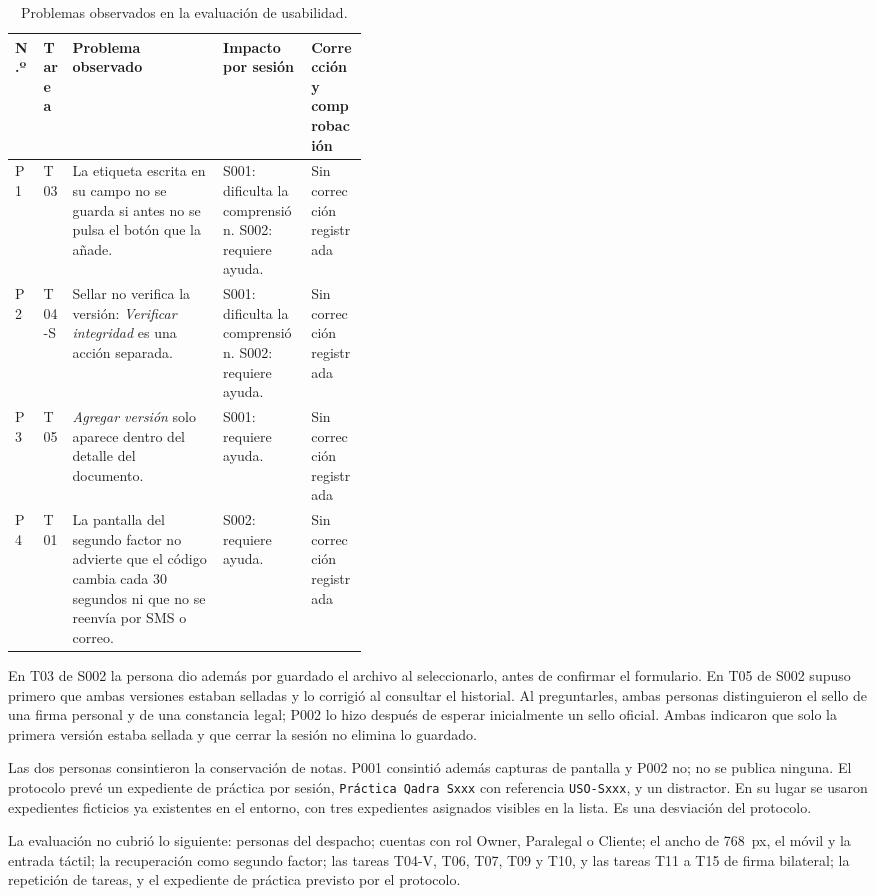 \begin{table}[H]
  \centering
  \caption{Problemas observados en la evaluación de usabilidad.}
  \label{tab:pruebas-usabilidad-problemas}
  
  \begin{tabularx}{\linewidth}{@{}l l X L{0.25\linewidth} L{0.16\linewidth}@{}}
    \toprule
    \textbf{N.º} & \textbf{Tarea} & \textbf{Problema observado} & \textbf{Impacto por sesión} & \textbf{Corrección y comprobación} \\
    \midrule
    P1 & T03 & La etiqueta escrita en su campo no se guarda si antes no se pulsa el botón que la añade. & S001: dificulta la comprensión. S002: requiere ayuda. & Sin corrección registrada \\
    \addlinespace
    P2 & T04-S & Sellar no verifica la versión: \emph{Verificar integridad} es una acción separada. & S001: dificulta la comprensión. S002: requiere ayuda. & Sin corrección registrada \\
    \addlinespace
    P3 & T05 & \emph{Agregar versión} solo aparece dentro del detalle del documento. & S001: requiere ayuda. & Sin corrección registrada \\
    \addlinespace
    P4 & T01 & La pantalla del segundo factor no advierte que el código cambia cada 30 segundos ni que no se reenvía por SMS o correo. & S002: requiere ayuda. & Sin corrección registrada \\
    \bottomrule
  \end{tabularx}
\end{table}

En T03 de S002 la persona dio además por guardado el archivo al seleccionarlo,
antes de confirmar el formulario. En T05 de S002 supuso primero que ambas
versiones estaban selladas y lo corrigió al consultar el historial. Al
preguntarles, ambas personas distinguieron el sello de una firma personal y de
una constancia legal; P002 lo hizo después de esperar inicialmente un sello
oficial. Ambas indicaron que solo la primera versión estaba sellada y que
cerrar la sesión no elimina lo guardado.

Las dos personas consintieron la conservación de notas. P001 consintió además
capturas de pantalla y P002 no; no se publica ninguna. El protocolo prevé un
expediente de práctica por sesión, \texttt{Práctica Qadra Sxxx} con referencia
\texttt{USO-Sxxx}, y un distractor. En su lugar se usaron expedientes ficticios
ya existentes en el entorno, con tres expedientes asignados visibles en la
lista. Es una desviación del protocolo.

La evaluación no cubrió lo siguiente: personas del despacho; cuentas con rol
Owner, Paralegal o Cliente; el ancho de 768~px, el móvil y la
entrada táctil; la recuperación como segundo factor; las tareas T04-V, T06,
T07, T09 y T10, y las tareas T11 a T15 de firma bilateral; la repetición de
tareas, y el expediente de práctica previsto por el protocolo.
